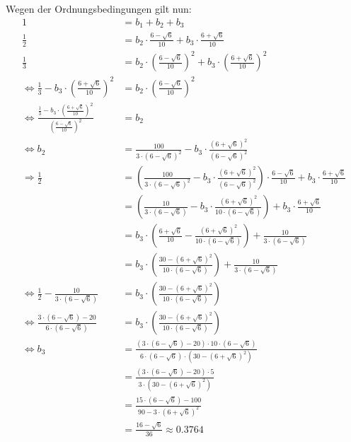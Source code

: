 Wegen der Ordnungsbedingungen gilt nun:
\begin{align}
    1 &= b_1 + b_2 + b_3\\
    \frac{1}{2} &= b_2 \cdot \frac{6-\sqrt{6}}{10} + b_3 \cdot \frac{6+\sqrt{6}}{10}\\
    \frac{1}{3} &= b_2 \cdot \left (\frac{6-\sqrt{6}}{10} \right )^2 + b_3 \cdot \left (\frac{6+\sqrt{6}}{10} \right )^2\\
    \Leftrightarrow \frac{1}{3} - b_3 \cdot \left (\frac{6+\sqrt{6}}{10} \right )^2 &= b_2 \cdot \left (\frac{6-\sqrt{6}}{10} \right )^2\\
    \Leftrightarrow \frac{\frac{1}{3} - b_3 \cdot \left (\frac{6+\sqrt{6}}{10} \right )^2}{\left (\frac{6-\sqrt{6}}{10} \right )^2} &= b_2\\
    \Leftrightarrow b_2 &= \frac{100}{3 \cdot (6-\sqrt{6})^2} - b_3 \cdot \frac{(6+\sqrt{6})^2}{(6-\sqrt{6})^2}\\
    \Rightarrow \frac{1}{2} &= \left ( \frac{100}{3 \cdot (6-\sqrt{6})^2} - b_3 \cdot \frac{(6+\sqrt{6})^2}{(6-\sqrt{6})^2} \right ) \cdot \frac{6-\sqrt{6}}{10} + b_3 \cdot \frac{6+\sqrt{6}}{10}\\
    &= \left (\frac{10}{3 \cdot (6 - \sqrt{6})} - b_3 \cdot \frac{(6+\sqrt{6})^2}{10 \cdot (6 - \sqrt{6})} \right ) + b_3 \cdot \frac{6+\sqrt{6}}{10}\\
    &= b_3 \cdot \left (\frac{6+\sqrt{6}}{10} - \frac{(6+\sqrt{6})^2}{10 \cdot (6 - \sqrt{6})} \right ) + \frac{10}{3 \cdot (6 - \sqrt{6})}\\
    &= b_3 \cdot \left (\frac{30-(6+\sqrt{6})^2}{10 \cdot (6 - \sqrt{6})} \right ) + \frac{10}{3 \cdot (6 - \sqrt{6})}\\
\Leftrightarrow \frac{1}{2} - \frac{10}{3 \cdot (6 - \sqrt{6})} &= b_3 \cdot \left (\frac{30-(6+\sqrt{6})^2}{10 \cdot (6 - \sqrt{6})} \right )\\
\Leftrightarrow \frac{3 \cdot (6 - \sqrt{6}) - 20}{6\cdot (6 - \sqrt{6})} &= b_3 \cdot \left (\frac{30-(6+\sqrt{6})^2}{10 \cdot (6 - \sqrt{6})} \right )\\
\Leftrightarrow b_3 &= \frac{(3 \cdot (6 - \sqrt{6}) - 20) \cdot 10 \cdot (6 - \sqrt{6})}{6\cdot (6 - \sqrt{6}) \cdot (30-(6+\sqrt{6})^2)}\\
&= \frac{(3 \cdot (6 - \sqrt{6}) - 20) \cdot 5}{3 \cdot (30-(6+\sqrt{6})^2)}\\
&= \frac{15 \cdot (6 - \sqrt{6}) - 100}{90-3 \cdot (6+\sqrt{6})^2}\\
&= \frac{16-\sqrt{6}}{36} \approx 0.3764\\

\end{align}
